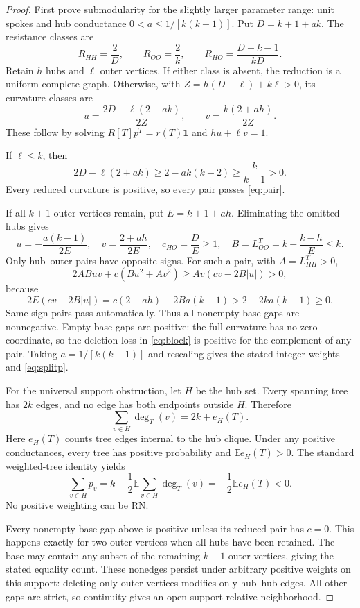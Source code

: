 \documentclass[11pt,a4paper]{article}
\newcommand{\one}{\boldsymbol1}
\begin{document}
\begin{proof}
First prove submodularity for the slightly larger parameter range: unit spokes and hub conductance
$0<a\le1/[k(k-1)]$. Put $D=k+1+ak$. The resistance classes are
\[
R_{HH}=\frac2D,\qquad R_{OO}=\frac2k,\qquad
R_{HO}=\frac{D+k-1}{kD}.
\]
Retain $h$ hubs and $\ell$ outer vertices. If either class is absent, the reduction is a uniform complete graph. Otherwise, with $Z=h(D-\ell)+k\ell>0$, its curvature classes are
\begin{equation}\label{eq:reducedsplit}
u=\frac{2D-\ell(2+ak)}{2Z},\qquad
v=\frac{k(2+ah)}{2Z}.
\end{equation}
These follow by solving $R[T]p^T=r(T)\one$ and $hu+\ell v=1$.

If $\ell\le k$, then
\[
2D-\ell(2+ak)\ge2-ak(k-2)
\ge\frac{k}{k-1}>0.
\]
Every reduced curvature is positive, so every pair passes \eqref{eq:pair}.

If all $k+1$ outer vertices remain, put $E=k+1+ah$. Eliminating the omitted hubs gives
\[
u=-\frac{a(k-1)}{2E},\quad
v=\frac{2+ah}{2E},\quad
c_{HO}=\frac DE\ge1,\quad
B=L^T_{OO}=k-\frac{k-h}{E}\le k.
\]
Only hub--outer pairs have opposite signs. For such a pair, with $A=L^T_{HH}>0$,
\[
2ABuv+c(Bu^2+Av^2)\ge Av(cv-2B|u|)>0,
\]
because
\[
2E(cv-2B|u|)
=c(2+ah)-2Ba(k-1)>2-2ka(k-1)\ge0.
\]
Same-sign pairs pass automatically. Thus all nonempty-base gaps are nonnegative. Empty-base gaps are positive: the full curvature has no zero coordinate, so the deletion loss in \eqref{eq:block} is positive for the complement of any pair. Taking $a=1/[k(k-1)]$ and rescaling gives the stated integer weights and \eqref{eq:splitp}.

For the universal support obstruction, let $H$ be the hub set. Every spanning tree has $2k$ edges, and no edge has both endpoints outside $H$. Therefore
\[
\sum_{v\in H}\deg_T(v)=2k+e_H(T).
\]
Here $e_H(T)$ counts tree edges internal to the hub clique. Under any positive conductances, every tree has positive probability and $\mathbb E e_H(T)>0$. The standard weighted-tree identity yields
\begin{equation}\label{eq:tree}
\sum_{v\in H}p_v
=k-\frac12\mathbb E\!\sum_{v\in H}\deg_T(v)
=-\frac12\mathbb E e_H(T)<0.
\end{equation}
No positive weighting can be RN.

Every nonempty-base gap above is positive unless its reduced pair has $c=0$. This happens exactly for two outer vertices when all hubs have been retained. The base may contain any subset of the remaining $k-1$ outer vertices, giving the stated equality count. These nonedges persist under arbitrary positive weights on this support: deleting only outer vertices modifies only hub--hub edges. All other gaps are strict, so continuity gives an open support-relative neighborhood.
\end{proof}
\end{document}
